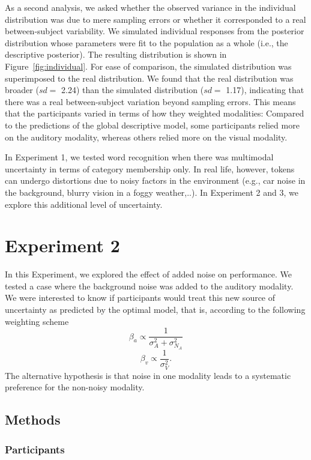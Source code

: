 \documentclass[english,floatsintext,man]{apa6}
\theoremstyle{definition}
\theoremstyle{definition}
\theoremstyle{definition}
\theoremstyle{remark}
\begin{document}
As a second analysis, we asked whether the observed variance in the
individual distribution was due to mere sampling errors or whether it
corresponded to a real between-subject variability. We simulated
individual responses from the posterior distribution whose parameters
were fit to the population as a whole (i.e., the descriptive posterior).
The resulting distribution is shown in Figure~\ref{fig:individual}. For
ease of comparison, the simulated distribution was superimposed to the
real distribution. We found that the real distribution was broader
(\(sd=\) 2.24) than the simulated distribution (\(sd=\) 1.17),
indicating that there was a real between-subject variation beyond
sampling errors. This means that the participants varied in terms of how
they weighted modalities: Compared to the predictions of the global
descriptive model, some participants relied more on the auditory
modality, whereas others relied more on the visual modality.

In Experiment 1, we tested word recognition when there was multimodal
uncertainty in terms of category membership only. In real life, however,
tokens can undergo distortions due to noisy factors in the environment
(e.g., car noise in the background, blurry vision in a foggy
weather,..). In Experiment 2 and 3, we explore this additional level of
uncertainty.

\section{Experiment 2}\label{experiment-2}

In this Experiment, we explored the effect of added noise on
performance. We tested a case where the background noise was added to
the auditory modality. We were interested to know if participants would
treat this new source of uncertainty as predicted by the optimal model,
that is, according to the following weighting scheme
\[\beta_a \propto \frac{1}{\sigma^2_{A}+\sigma^2_{N_A}}\]
\[\beta_v \propto \frac{1}{\sigma^2_{V}}.\] The alternative hypothesis
is that noise in one modality leads to a systematic preference for the
non-noisy modality.

\subsection{Methods}\label{methods-1}

\subsubsection{Participants}\label{participants-1}
\end{document}
